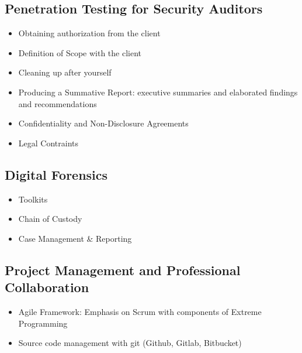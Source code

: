 \documentclass[letterpaper,10pt,english]{sphinxmanual}
\begin{document}
\subsection{Penetration Testing for Security Auditors}
\label{cybersecurity:penetration-testing-for-security-auditors}\begin{itemize}
\item {} 
Obtaining authorization from the client

\item {} 
Definition of Scope with the client

\item {} 
Cleaning up after yourself

\item {} 
Producing a Summative Report: executive summaries and elaborated findings and recommendations

\item {} 
Confidentiality and Non-Disclosure Agreements

\item {} 
Legal Contraints

\end{itemize}


\subsection{Digital Forensics}
\label{cybersecurity:digital-forensics}\begin{itemize}
\item {} 
Toolkits

\item {} 
Chain of Custody

\item {} 
Case Management \& Reporting

\end{itemize}


\subsection{Project Management and Professional Collaboration}
\label{cybersecurity:project-management-and-professional-collaboration}\begin{itemize}
\item {} 
Agile Framework: Emphasis on Scrum with components of Extreme Programming

\item {} 
Source code management with git (Github, Gitlab, Bitbucket)

\end{itemize}
\end{document}
